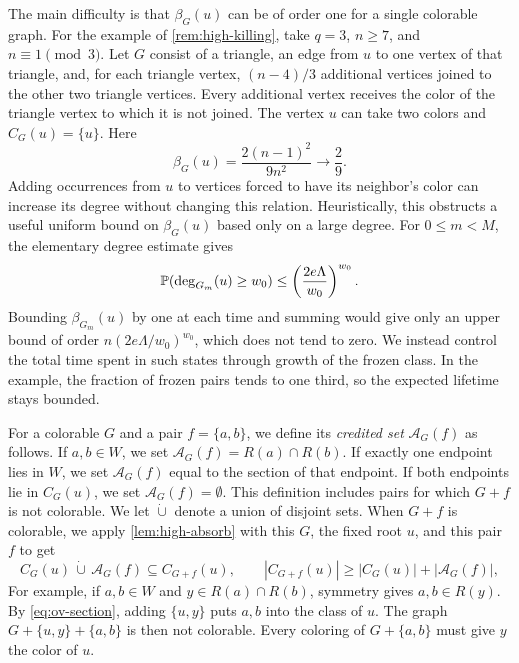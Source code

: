 The main difficulty is that $\beta_G(u)$ can be of order one for a single colorable graph. For the example of \cref{rem:high-killing}, take $q = 3$, $n \ge 7$, and $n \equiv 1\pmod3$. Let $G$ consist of a triangle, an edge from $u$ to one vertex of that triangle, and, for each triangle vertex, $(n - 4)/3$ additional vertices joined to the other two triangle vertices. Every additional vertex receives the color of the triangle vertex to which it is not joined. The vertex $u$ can take two colors and $C_G(u) = \{u\}$. Here
\[
\beta_G(u) = \frac{2(n - 1)^2}{9n^2}\longrightarrow\frac29.
\]
Adding occurrences from $u$ to vertices forced to have its neighbor's color can increase its degree without changing this relation. Heuristically, this obstructs a useful uniform bound on $\beta_G(u)$ based only on a large degree. For $0 \le m < M$, the elementary degree estimate gives
\[
\mathbb P(\deg_{G_m}(u) \ge w_0) \le \left(\frac{2e\Lambda}{w_0}\right)^{w_0}.
\]
Bounding $\beta_{G_m}(u)$ by one at each time and summing would give only an upper bound of order $n(2e\Lambda/w_0)^{w_0}$, which does not tend to zero. We instead control the total time spent in such states through growth of the frozen class. In the example, the fraction of frozen pairs tends to one third, so the expected lifetime stays bounded.

For a colorable $G$ and a pair $f = \{a, b\}$, we define its \emph{credited set} $\mathscr A_G(f)$ as follows. If $a, b \in W$, we set $\mathscr A_G(f) = R(a) \cap R(b)$. If exactly one endpoint lies in $W$, we set $\mathscr A_G(f)$ equal to the section of that endpoint. If both endpoints lie in $C_G(u)$, we set $\mathscr A_G(f) = \emptyset$. This definition includes pairs for which $G + f$ is not colorable. We let $\dot \cup$ denote a union of disjoint sets. When $G + f$ is colorable, we apply \cref{lem:high-absorb} with this $G$, the fixed root $u$, and this pair $f$ to get
\[
C_G(u)\,\dot \cup \,\mathscr A_G(f) \subseteq C_{G + f}(u), \qquad
|C_{G + f}(u)| \ge |C_G(u)| + |\mathscr A_G(f)|,
\]
For example, if $a, b \in W$ and $y \in R(a) \cap R(b)$, symmetry gives $a, b \in R(y)$. By \eqref{eq:ov-section}, adding $\{u, y\}$ puts $a, b$ into the class of $u$. The graph $G + \{u, y\} + \{a, b\}$ is then not colorable. Every coloring of $G + \{a, b\}$ must give $y$ the color of $u$.

